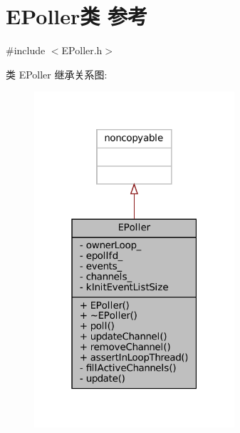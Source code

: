 \hypertarget{classmuduo_1_1EPoller}{}\section{E\+Poller类 参考}
\label{classmuduo_1_1EPoller}


{\ttfamily \#include $<$E\+Poller.\+h$>$}



类 E\+Poller 继承关系图\+:
\nopagebreak
\begin{figure}[H]
\begin{center}
\leavevmode
\includegraphics[width=211pt]{classmuduo_1_1EPoller__inherit__graph}
\end{center}
\end{figure}


